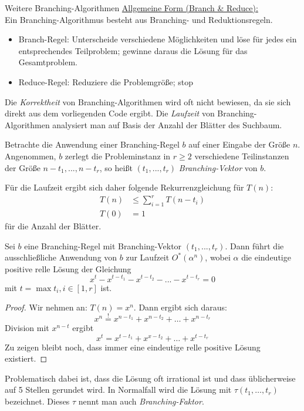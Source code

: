 \begin{section}{Weitere Branching-Algorithmen}
  \underline{Allgemeine Form (Branch \& Reduce):}\\
  Ein Branching-Algorithmus besteht aus Branching- und Reduktionsregeln. 
  \begin{itemize}
   \item Branch-Regel: Unterscheide verschiedene Möglichkeiten und löse für jedes ein entsprechendes Teilproblem; gewinne daraus die Lösung für das Gesamtproblem.
   \item Reduce-Regel: Reduziere die Problemgröße; stop
  \end{itemize}
  Die \textit{Korrektheit} von Branching-Algorithmen wird oft nicht bewiesen, da sie sich direkt aus dem vorliegenden Code ergibt. Die \textit{Laufzeit} von Branching-Algorithmen analysiert man auf Basis der Anzahl der Blätter des Suchbaum.

  \begin{definition}
    Betrachte die Anwendung einer Branching-Regel $b$ auf einer Eingabe der Größe $n$. Angenommen, $b$ zerlegt die Probleminstanz in \(r \geq 2\) verschiedene Teilinstanzen der Größe $n - t_1, ..., n - t_r$, so heißt $(t_1,...,t_r)$ \textit{Branching-Vektor} von $b$. 
  \end{definition}
  
  Für die Laufzeit ergibt sich daher folgende Rekurrenzgleichung für $T(n)$: 
  \begin{align*}
    T(n) &\leq \sum_{i=1}^r T(n-t_i)\\
    T(0) &= 1
  \end{align*}
  für die Anzahl der Blätter.
  
  \begin{theorem} \label{satzLaufzeit}
    Sei \(b\) eine Branching-Regel mit Branching-Vektor \( (t_1,...,t_r) \). Dann führt die ausschließliche Anwendung von \(b\) zur Laufzeit \(O^*(\alpha^n)\), wobei \(\alpha\) die eindeutige positive relle Lösung der Gleichung 
    \[ x^t - x^{t-t_1} - x^{t - t_2} - ... - x^{t - t_r} = 0 \] 
    mit \(t = \max t_i, i \in [1,r]\) ist.
  \end{theorem}
  \begin{proof}
    Wir nehmen an: $T(n) = x^n$. Dann ergibt sich daraus:
    \[ x^n \overset{!}{=} x^{n-t_1} + x^{n-t_2}+\dots+x^{n-t_r}\]
    Division mit $x^{n-t}$ ergibt
    \[ x^t = x^{t-t_1}+x^{x-t_2}+\dots+x^{t-t_r}\]
    Zu zeigen bleibt noch, dass immer eine eindeutige relle positive Lösung existiert. 
  \end{proof}
  Problematisch dabei ist, dass die Lösung oft irrational ist und dass üblicherweise auf 5 Stellen gerundet wird. In Normalfall wird die Lösung mit $\tau(t_1,\dots,t_r)$ bezeichnet. Dieses $\tau$ nennt man auch \textit{Branching-Faktor}.
  

\end{section}
